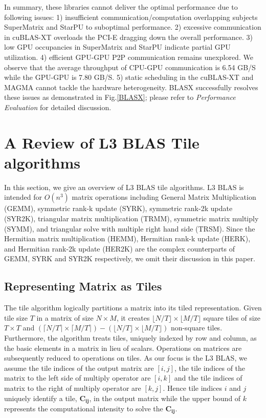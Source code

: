 \documentclass[conference]{IEEEtran}
\begin{document}
In summary, these libraries cannot deliver the optimal performance due to following issues:
1) insufficient communication/computation overlapping subjects SuperMatrix and StarPU
to suboptimal performance. 2) excessive communication in cuBLAS-XT overloads the PCI-E
dragging down the overall performance. 3) low GPU occupancies in SuperMatrix and StarPU
indicate partial GPU utilization.
4) efficient GPU-GPU P2P communication remains unexplored. We observe that the 
average throughput of CPU-GPU communication is 6.54 GB/S while the GPU-GPU is 7.80 GB/S. 
5) static scheduling in the cuBLAS-XT and MAGMA cannot tackle the hardware heterogeneity.
BLASX successfully resolves these issues as 
demonstrated in Fig.\ref{BLASX}; please refer to \textit{Performance Evaluation} for detailed 
discussion.

\vspace{-0.1in}
\section{A Review of L3 BLAS Tile algorithms}
In this section, we give an overview of L3 BLAS tile algorithms. L3 BLAS is intended for $O(n^3)$ matrix 
operations including General Matrix Multiplication (GEMM), symmetric rank-k update (SYRK), 
symmetric rank-2k update (SYR2K), triangular matrix multiplication (TRMM), symmetric matrix 
multiply (SYMM), and triangular solve with multiple right hand side (TRSM). Since the Hermitian 
matrix multiplication (HEMM), Hermitian rank-k update (HERK), and Hermitian rank-2k update 
(HER2K) are the complex counterparts of GEMM, SYRK and SYR2K respectively, we omit their 
discussion in this paper.

\vspace{-0.12in}
\subsection{Representing Matrix as Tiles}
\vspace{-0.05in}
The tile algorithm logically partitions a matrix into its tiled representation. 
Given tile size $T$ in a matrix of size $ N \times M $, it creates $\lfloor N/T \rfloor \times \lfloor M/T \rfloor $ 
square tiles of size $ T \times T $ and $(\lceil N/T \rceil \times \lceil M/T \rceil ) - (\lfloor N/T \rfloor \times \lfloor M/T \rfloor)$ non-square tiles.
Furthermore, the algorithm treats tiles, uniquely indexed by row and column, as the basic 
elements in a matrix in lieu of scalars. Operations on matrices are subsequently reduced 
to operations on tiles. As our focus is the L3 BLAS, we assume the tile indices 
of the output matrix are $[i, j]$, the tile indices of the matrix to the left side of 
multiply operator are $[i, k]$ and the tile indices of matrix to the right of multiply 
operator are $[k, j]$. Hence tile indices $i$ and $j$ uniquely identify a tile, $\mathbf{C_{ij}}$, 
in the output matrix while the upper bound of $k$ represents the computational intensity to solve the $\mathbf{C_{ij}}$.
\end{document}
